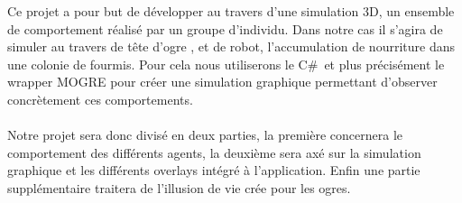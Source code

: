 Ce projet a pour but de développer au travers d'une simulation 3D, un
ensemble de comportement réalisé par un groupe d'individu. Dans notre cas il
s'agira de simuler au travers de tête d'ogre , et de robot, l'accumulation de
nourriture dans une colonie de fourmis. Pour cela nous utiliserons le C\# et
plus précisément le wrapper MOGRE pour créer une simulation graphique permettant
d'observer concrètement ces comportements.

\paragraph{}

Notre projet sera donc divisé en deux parties, la première concernera 
le comportement des différents agents, la deuxième sera axé sur la simulation
graphique et les différents overlays intégré à l'application. Enfin une partie
supplémentaire traitera de l'illusion de vie crée pour les ogres.

